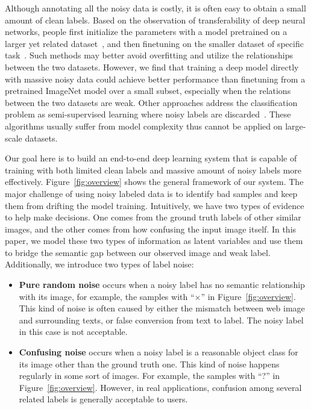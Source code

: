 \documentclass[10pt,twocolumn,letterpaper]{article}
\begin{document}
Although annotating all the noisy data is costly, it is often easy to obtain a small amount of clean labels. Based on the observation of transferability of deep neural networks, people first initialize the parameters with a model pretrained on a larger yet related dataset~\cite{krizhevsky2012imagenet}, and then finetuning on the smaller dataset of specific task~\cite{oquab2013learning,azizpour2014generic}. Such methods may better avoid overfitting and utilize the relationships between the two datasets. However, we find that training a deep model directly with massive noisy data could achieve better performance than finetuning from a pretrained ImageNet model over a small subset, especially when the relations between the two datasets are weak. Other approaches address the classification problem as semi-supervised learning where noisy labels are discarded~\cite{zhu2002learning}. These algorithms usually suffer from model complexity thus cannot be applied on large-scale datasets. 

Our goal here is to build an end-to-end deep learning system that is capable of training with both limited clean labels and massive amount of noisy labels more effectively. Figure~\ref{fig:overview} shows the general framework of our system. The major challenge of using noisy labeled data is to identify bad samples and keep them from drifting the model training. Intuitively, we have two types of evidence to help make decisions. One comes from the ground truth labels of other similar images, and the other comes from how confusing the input image itself. In this paper, we model these two types of information as latent variables and use them to bridge the semantic gap between our observed image and weak label. Additionally, we introduce two types of label noise:
\begin{itemize}
   \item \textbf{Pure random noise} occurs when a noisy label has no semantic relationship with its image, for example, the samples with ``$\times$'' in Figure~\ref{fig:overview}. This kind of noise is often caused by either the mismatch between web image and surrounding texts, or false conversion from text to label. The noisy label in this case is not acceptable.
   \item \textbf{Confusing noise} occurs when a noisy label is a reasonable object class for its image other than the ground truth one. This kind of noise happens regularly in some sort of images. For example, the samples with ``?'' in Figure~\ref{fig:overview}. However, in real applications, confusion among several related labels is generally acceptable to users.
\end{itemize}
\end{document}
